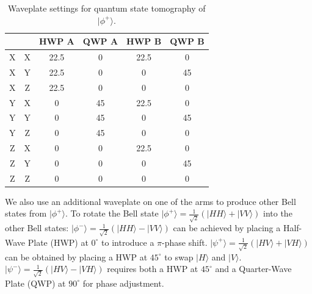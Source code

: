 \begin{table}[h!]
\centering
\begin{tabular}{|c|c|c|c|c|c|}
\hline
\multicolumn{2}{|c|}{\textbf{}} & \textbf{HWP A} & \textbf{QWP A} & \textbf{HWP B} & \textbf{QWP B} \\ \hline
X              & X                     & 22.5           & 0              & 22.5           & 0              \\ \hline
X              & Y                     & 22.5           & 0              & 0              & 45             \\ \hline
X              & Z                     & 22.5           & 0              & 0              & 0              \\ \hline
Y              & X                     & 0              & 45             & 22.5           & 0              \\ \hline
Y              & Y                     & 0              & 45             & 0              & 45             \\ \hline
Y              & Z                     & 0              & 45             & 0              & 0              \\ \hline
Z              & X                     & 0              & 0              & 22.5           & 0              \\ \hline
Z              & Y                     & 0              & 0              & 0              & 45             \\ \hline
Z              & Z                     & 0              & 0              & 0              & 0              \\ \hline
\end{tabular}
\caption{Waveplate settings for quantum state tomography of $|\phi^+\rangle$.}
\label{tab:waveplate_settings}
\end{table}
We also use an additional waveplate on one of the arms to produce other Bell states from $|\phi^+\rangle$. 
To rotate the Bell state \( |\phi^+\rangle = \frac{1}{\sqrt{2}} (|HH\rangle + |VV\rangle) \) into the other Bell states:
 \( |\phi^-\rangle = \frac{1}{\sqrt{2}} (|HH\rangle - |VV\rangle) \) can be achieved by placing a Half-Wave Plate (HWP) at \( 0^\circ \) to introduce a \( \pi \)-phase shift.
 \( |\psi^+\rangle = \frac{1}{\sqrt{2}} (|HV\rangle + |VH\rangle) \) can be obtained by placing a HWP at \( 45^\circ \) to swap \(|H\rangle\) and \(|V\rangle\).
 \( |\psi^-\rangle = \frac{1}{\sqrt{2}} (|HV\rangle - |VH\rangle) \) requires both a HWP at \( 45^\circ \) and a Quarter-Wave Plate (QWP) at \( 90^\circ \) for phase adjustment.